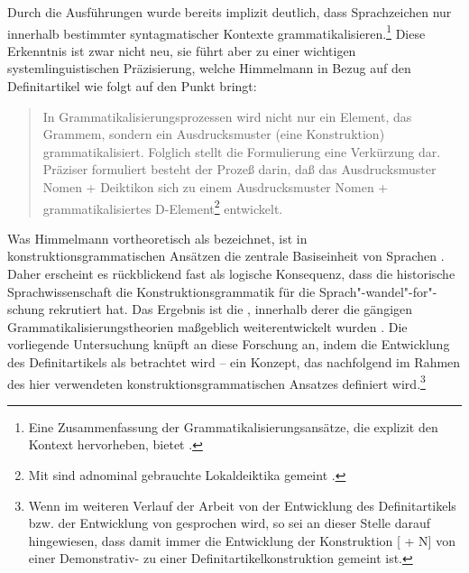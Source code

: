 Durch die Ausführungen wurde bereits implizit deutlich, dass Sprachzeichen nur innerhalb bestimmter syntagmatischer Kontexte grammatikalisieren.\footnote{Eine Zusammenfassung der Grammatikalisierungsansätze, die explizit den Kontext hervorheben, bietet \textcite{Traugott2003,Traugott2008a}.} 
Diese Erkenntnis ist zwar nicht neu, sie führt aber zu einer wichtigen systemlinguistischen Präzisierung, welche Himmelmann in Bezug auf den Definitartikel wie folgt auf den Punkt bringt: \blockcquote[31]{Himmelmann1997}{In Grammatikalisierungsprozessen wird nicht nur ein Element, das Grammem, sondern ein Ausdrucksmuster (eine Konstruktion) grammatikalisiert. Folglich stellt die Formulierung  eine Verkürzung dar. Präziser formuliert besteht der Prozeß darin, daß das Ausdrucksmuster Nomen + Deiktikon sich zu einem Ausdrucksmuster Nomen + grammatikalisiertes D-Element\footnote{Mit  sind adnominal gebrauchte Lokaldeiktika gemeint \parencite[6]{Himmelmann1997}.} 
 entwickelt.} 
Was Himmelmann vortheoretisch als  bezeichnet, ist in konstruktionsgrammatischen Ansätzen die zentrale Basiseinheit von Sprachen \parencite[s. u.a.][]{Goldberg1995,Goldberg2006}. Daher erscheint es rückblickend fast als logische Konsequenz, dass die historische Sprachwissenschaft die Konstruktionsgrammatik für die Sprach"-wandel"-for"-schung rekrutiert hat. Das Ergebnis ist die  \parencite[vgl. u.a.][]{Barddal2015}, innerhalb derer die gängigen Grammatikalisierungstheorien maßgeblich weiterentwickelt wurden \parencite[s. hierzu u.a.][]{Traugott2003,Bergs2008,Diewald2008,Fried2013,Traugott2013}. Die vorliegende Untersuchung knüpft an diese Forschung an, indem die Entwicklung des Definitartikels als  betrachtet wird -- ein Konzept, das nachfolgend im Rahmen des hier verwendeten konstruktionsgrammatischen Ansatzes definiert wird.\footnote{Wenn im weiteren Verlauf der Arbeit von der Entwicklung des Definitartikels bzw. der Entwicklung von  gesprochen wird, so sei an dieser Stelle darauf hingewiesen, dass damit immer die Entwicklung der Konstruktion [ + N] von einer Demonstrativ- zu einer Definitartikelkonstruktion gemeint ist.}  

